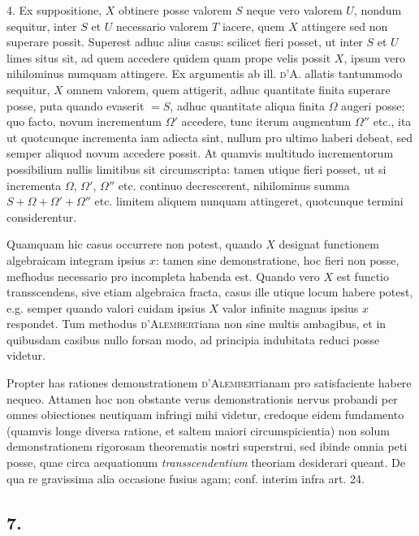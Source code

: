 \documentclass[twoside,12pt, showframe]{memoir}
\begin{document}
4. Ex suppositione, \(X\) obtinere posse valorem \(S\) neque vero valorem \(U\), nondum sequitur, inter \(S\) et \(U\) necessario valorem \(T\) iacere, quem \(X\) attingere sed non superare possit. Superest adhuc alius casus: scilicet fieri posset, ut inter \(S\) et \(U\) limes situs sit, ad quem accedere quidem quam prope velis possit \(X\), ipsum vero nihilominus numquam attingere. Ex argumentis ab ill. \textsc{d'A.} allatis tantummodo sequitur, \(X\) omnem valorem, quem attigerit, adhuc quantitate finita superare posse, puta quando evaserit \(= S\), adhuc quantitate aliqua finita \(\Omega\) augeri posse; quo facto, novum incrementum \(\Omega'\) accedere, tunc iterum augmentum \(\Omega''\) etc{.}, ita ut quotcunque incrementa iam adiecta sint, nullum pro ultimo haberi debeat, sed semper aliquod novum accedere possit. At quamvis multitudo incrementorum possibilium nullis limitibus sit circumscripta: tamen utique fieri posset, ut si incrementa \(\Omega\), \(\Omega'\), \(\Omega''\) etc{.} continuo decrescerent, nihilominus summa \(S +\Omega + \Omega' + \Omega''\) etc{.} limitem aliquem nunquam attingeret, quotcunque termini considerentur.

Quamquam hic casus occurrere non potest, quando \(X\) designat functionem algebraicam integram ipsius \(x\): tamen sine demonstratione, hoc fieri non posse, mefhodus necessario pro incompleta habenda est. Quando vero \(X\) est functio transscendens, sive etiam algebraica fracta, casus ille utique locum habere potest, e.g. semper quando valori cuidam ipsius \(X\) valor infinite magnus ipsius \(x\) respondet. Tum methodus \textsc{d'Alembert}iana non sine multis ambagibus, et in quibusdam casibus nullo forsan modo, ad principia indubitata reduci posse videtur.


Propter has rationes demonstrationem \textsc{d'Alembert}ianam pro satisfaciente habere nequeo. Attamen hoc non obstante verus demonstrationis nervus probandi per omnes obiectiones neutiquam infringi mihi videtur, credoque eidem fundamento (quamvis longe diversa ratione, et saltem maiori circumspicientia) non solum demonstrationem rigorosam theorematis nostri superstrui, sed ibinde omnia peti posse, quae circa aequationum \textit{transscendentium} theoriam desiderari queant. De qua re gravissima alia occasione fusius agam; conf. interim infra art. 24.

\subsection*{7.}
\end{document}
